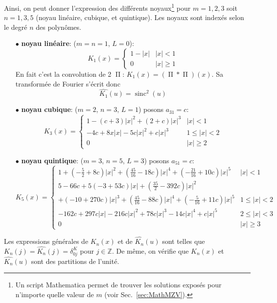 \documentclass[11pt,twoside]{article}
\DeclareMathOperator{\sinc}{sinc}
\DeclareMathOperator{\boxcar}{{\mbox{$\Pi$}}}
\begin{document}
Ainsi, on peut donner l'expression des différents noyaux\footnote{Un script Mathematica permet de trouver les solutions exposés pour n'importe quelle valeur de $m$ (voir Sec.~\ref{sec:MathMZV}).} pour $m=1,2,3$ soit $n=1,3,5$ (noyau linéaire, cubique, et quintique). Les noyaux sont indexés selon le degré $n$ des polynômes.
\begin{itemize}
\item[$\bullet$ \textbf{noyau linéaire}:] ($m=n=1$, $L=0$):
\begin{equation}
K_1(x) = \begin{cases}
1-|x| & |x|< 1 \\
0 & |x| \geq 1
\end{cases}
\label{eq:interp-lineaire}
\end{equation}
En fait c'est la convolution de 2 $\boxcar$: $K_1(x) = (\boxcar \ast \boxcar)(x)$. Sa transformée de Fourier s'écrit donc
\begin{equation}
\hat{K_1}(u) = \sinc^2(u)
\end{equation}
\item[$\bullet$ \textbf{noyau cubique}:]  ($m=2$, $n=3$, $L=1$) posons $a_{31}=c$:
\begin{equation}
K_3(x) = \begin{cases}
1 -(c+3)|x|^2+(2+c)|x|^3 & |x|< 1 \\
-4c + 8x |x|-5c |x|^2+ c |x|^3 & 1\leq |x|<2 \\
0 & |x| \geq 2
\end{cases}
\label{eq:cubic-kernel}
\end{equation}
\item[$\bullet$ \textbf{noyau quintique}:] ($m=3$, $n=5$, $L=3$)  posons $a_{51}=c$:
\begin{equation}
K_5(x) = \begin{cases}
1 +\left(-\frac{5}{2}+8c\right) |x|^2+\left(\frac{45}{16}-18c\right)|x|^4
+ \left(-\frac{21}{16}+10c\right)|x|^5 & |x|< 1 \\
5-66c + 5(-3+53c)|x|+\left(\frac{35}{2}-392c\right)|x|^2 &\\
+(-10+270c)|x|^3+\left(\frac{45}{16}-88c\right)|x|^4+ \left(-\frac{5}{16}+11c\right)|x|^5 & 1\leq |x|<2 \\
-162c + 297 c |x|-216 c|x|^2 + 78 c |x|^3-14 c |x|^4 + c |x|^5 & 2\leq |x|<3\\
0 & |x|\geq 3
\end{cases}
\label{eq:quinticMZV-kernel}
\end{equation}
\end{itemize}
Les expressions générales de $K_n(x)$ et de $\hat{K_n}(u)$ sont telles que $K_n(j)=\hat{K_n}(j)=\delta^K_{0j}$ pour $j\in\mathbb{Z}$. De même, on vérifie que $K_n(x)$ et $\hat{K_n}(u)$ sont des partitions de l'unité.
\end{document}
